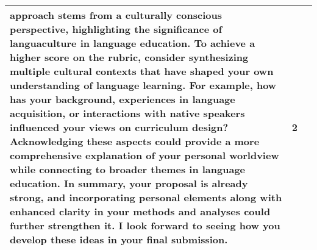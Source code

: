 \begin{longtable}{|p{}|p{}|p{}|}
approach stems from a culturally conscious perspective, highlighting the significance of languaculture in language education. To achieve a higher score on the rubric, consider synthesizing multiple cultural contexts that have shaped your own understanding of language learning. For example, how has your background, experiences in language acquisition, or interactions with native speakers influenced your views on curriculum design? Acknowledging these aspects could provide a more comprehensive explanation of your personal worldview while connecting to broader themes in language education.  In summary, your proposal is already strong, and incorporating personal elements along with enhanced clarity in your methods and analyses could further strengthen it. I look forward to seeing how you develop these ideas in your final submission. & 2 \\
\hline

\end{longtable}
